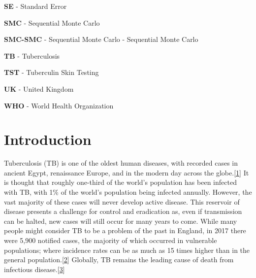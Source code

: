 \documentclass[11pt,twoside]{bristolthesis}
\begin{document}
\begin{acronyms}
      \par
      
      \textbf{SE} - Standard Error
      
      \par
      
      \textbf{SMC} - Sequential Monte Carlo
      
      \par
      
      \textbf{SMC-SMC} - Sequential Monte Carlo - Sequential Monte Carlo
      
      \par
      
      \textbf{TB} - Tuberculosis
      
      \par
      
      \textbf{TST} - Tuberculin Skin Testing
      
      \par
      
      \textbf{UK} - United Kingdom
      
      \par
      
      \textbf{WHO} - World Health Organization
      
      \par
    \end{acronyms}
  \mainmatter %
  \pagestyle{fancyplain} %

  \hypertarget{introduction}{%
  \chapter{Introduction}\label{introduction}}
  
  Tuberculosis (TB) is one of the oldest human diseases, with recorded cases in ancient Egypt, renaissance Europe, and in the modern day across the globe.{[}\protect\hyperlink{ref-Stone2009}{1}{]} It is thought that roughly one-third of the world's population has been infected with TB, with 1\% of the world's population being infected annually. However, the vast majority of these cases will never develop active disease. This reservoir of disease presents a challenge for control and eradication as, even if transmission can be halted, new cases will still occur for many years to come. While many people might consider TB to be a problem of the past in England, in 2017 there were 5,900 notified cases, the majority of which occurred in vulnerable populations; where incidence rates can be as much as 15 times higher than in the general population.{[}\protect\hyperlink{ref-PHE2017}{2}{]} Globally, TB remains the leading cause of death from infectious disease.{[}\protect\hyperlink{ref-TheWorldHealthOrganization:2018va}{3}{]}
  
\end{document}
